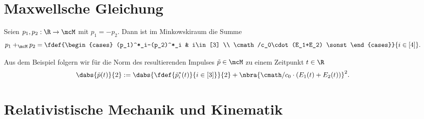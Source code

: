 \documentclass[../WiSe22ANA3.tex]{subfiles}
\begin{document}
	\section{Maxwellsche Gleichung}
	
		\begin{Beispiel}
			Seien $p_1,p_2:\R\to\mcM$ mit $p_1=-p_2$. Dann ist im Minkowskiraum die Summe
			$$p_1+_\mcM p_2=\fdef{\begin{cases}
				(p_1)^*_i-(p_2)^*_i & i\in [3] \\
				\cmath/c_0\cdot(E_1+E_2) \sonst
			\end{cases}}{i\in[4]}.$$
		\end{Beispiel}
		Aus dem Beispiel folgern wir für die Norm des resultierenden Impulses $\tilde p\in\mcM$ zu einem Zeitpunkt $t\in\R$
		$$\dabs{\tilde p(t)}{2}:=\dabs{\fdef{\tilde p_i^*(t)}{i\in[3]}}{2}+\nbra{\cmath/c_0\cdot(E_1(t)+E_2(t))}^2.$$
		
		
	\section{Relativistische Mechanik und Kinematik}
		\begin{info}
			
		\end{info}
\end{document}

